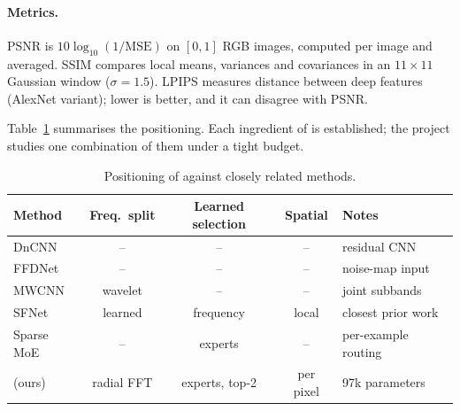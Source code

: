 \paragraph{Metrics.} PSNR is $10\log_{10}(1/\mathrm{MSE})$ on $[0,1]$ RGB
images, computed per image and averaged. SSIM compares local means, variances
and covariances in an $11\times11$ Gaussian window ($\sigma=1.5$). LPIPS
\cite{zhang2018lpips} measures distance between deep features (AlexNet
variant); lower is better, and it can disagree with PSNR.

Table~\ref{tab:gap} summarises the positioning. Each ingredient of \fcsg{} is
established; the project studies one combination of them under a tight
budget.

\begin{table}[htbp]
	\centering
	\caption{Positioning of \fcsg{} against closely related methods.}
	\label{tab:gap}
	\small
	\begin{tabular}{@{}lcccl@{}}
		\toprule
		Method & Freq.\ split & Learned selection & Spatial & Notes \\
		\midrule
		DnCNN \cite{zhang2017dncnn}      & --         & --              & --        & residual CNN \\
		FFDNet \cite{zhang2018ffdnet}    & --         & --              & --        & noise-map input \\
		MWCNN \cite{liu2018mwcnn}        & wavelet    & --              & --        & joint subbands \\
		SFNet \cite{cui2023sfnet}        & learned    & frequency       & local     & closest prior work \\
		Sparse MoE \cite{shazeer2017moe} & --         & experts         & --        & per-example routing \\
		\fcsg{} (ours)                   & radial FFT & experts, top-2  & per pixel & 97k parameters \\
		\bottomrule
	\end{tabular}
\end{table}
